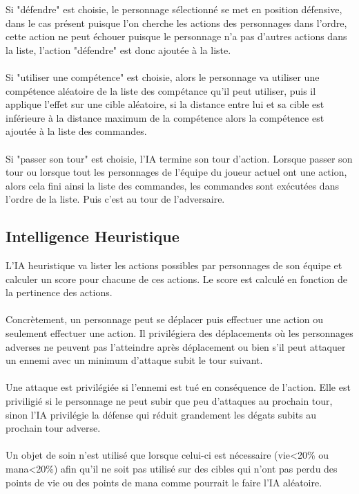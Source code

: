 Si "défendre" est choisie, le personnage sélectionné se met en 
position défensive, dans le cas présent puisque l'on cherche les 
actions des personnages dans l'ordre, cette action ne peut échouer 
puisque le personnage n'a pas d'autres actions dans la liste, 
l'action "défendre" est donc ajoutée à la liste.
\\\\
Si "utiliser une compétence" est choisie, alors le personnage va 
utiliser une compétence aléatoire de la liste des compétance qu'il 
peut utiliser, puis il applique l'effet sur une cible aléatoire, si 
la distance entre lui et sa cible est inférieure à la distance 
maximum de la compétence alors la compétence est ajoutée à la liste 
des commandes.
\\\\
Si "passer son tour" est choisie, l'IA termine son tour d’action.
Lorsque passer son tour ou lorsque tout les personnages de l'équipe 
du joueur actuel ont une action, alors cela fini ainsi la liste des 
commandes, les commandes sont exécutées dans l'ordre de la liste. 
Puis c'est au tour de l'adversaire.
\\

\subsection{Intelligence Heuristique}

L'IA heuristique va lister les actions possibles par personnages 
de son équipe et calculer un score pour chacune de ces actions.
Le score est calculé en fonction de la pertinence des actions.
\\\\
Concrètement, un personnage peut se déplacer puis effectuer une action ou
seulement effectuer une action.
Il privilégiera des déplacements où les personnages adverses ne peuvent
pas l'atteindre après déplacement ou bien s'il peut attaquer un ennemi
avec un minimum d'attaque subit le tour suivant.
\\\\
Une attaque est privilégiée si l'ennemi est tué en conséquence de
l'action. Elle est priviligié si le personnage ne peut subir que peu 
d'attaques au prochain tour, sinon l'IA privilégie la défense qui réduit
grandement les dégats subits au prochain tour adverse.
\\\\
Un objet de soin n'est utilisé que lorsque celui-ci est nécessaire 
(vie<20\% ou mana<20\%) afin qu'il ne soit pas utilisé sur des cibles qui 
n'ont pas perdu des points de vie ou des points de mana comme pourrait le 
faire l'IA aléatoire.
\\



